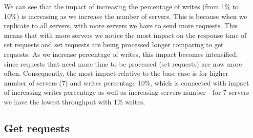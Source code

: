 \documentclass[11pt]{article}
\begin{document}
We can see that the impact of increasing the percentage of writes (from 1\% to 10\%) is increasing as we increase the number of servers. This is because when we replicate to all servers, with more servers we have to send more requests. This means that with more servers we notice the most impact on the response time of set requests and set requests are being processed longer comparing to get requests. As we increase percentage of writes, this impact becomes intensified, since requests that need more time to be processed (set requests) are now more often. Consequently, the most impact relative to the base case is for higher number of servers (7) and writes percentage 10\%, which is connected with impact of increasing writes percentage as well as increasing servers number - for 7 servers we have the lowest throughput with 1\% writes.

\subsection{Get requests}
\end{document}
